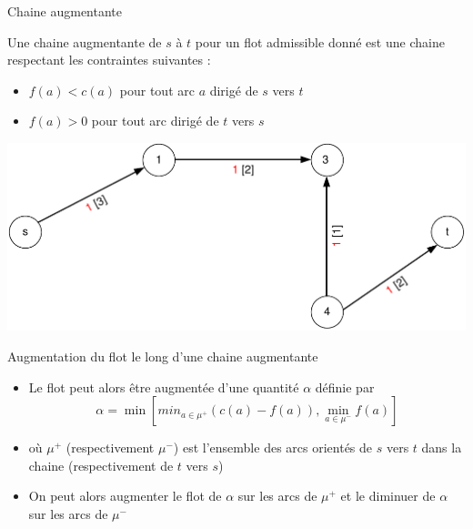 \begin{frame}{Chaine augmentante}
    \begin{definition}
        Une chaine augmentante de $s$ à $t$ pour un flot admissible donné est une chaine respectant les contraintes suivantes :
        \begin{itemize}
            \item $f(a) < c(a)$ pour tout arc $a$ dirigé de $s$ vers $t$ 
            \item $f(a) > 0$ pour tout arc dirigé de $t$ vers $s$
        \end{itemize}
    \end{definition}    
    \begin{example}
        \begin{center}
            \includegraphics[height=0.35\textheight]{fig/flot3.pdf}
        \end{center}
        
    \end{example}
\end{frame}

\begin{frame}{Augmentation du flot le long d'une chaine augmentante}
    \begin{itemize}
        \item Le flot peut alors être augmentée d'une quantité $\alpha$ définie par 
        $$
        \alpha = \min \left[ 
            min_{a \in \mu^+} (c(a) - f(a)) , \min_{a \in \mu^- } f(a)
        \right]
        $$
        \item où $\mu^+$ (respectivement $\mu^-$) est l'ensemble des arcs orientés de $s$ vers $t$ dans la chaine (respectivement de $t$ vers $s$)
        \item On peut alors augmenter le flot de $\alpha$ sur les arcs de  $\mu^+$ et le diminuer de $\alpha$ sur les arcs de $\mu^-$
    \end{itemize}
\end{frame}

